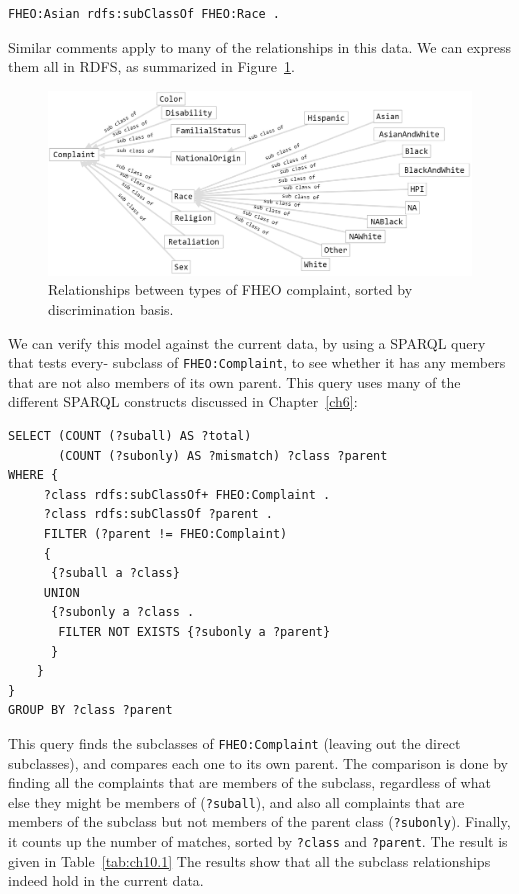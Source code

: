 \begin{lstlisting}
FHEO:Asian rdfs:subClassOf FHEO:Race .
\end{lstlisting}

Similar comments apply to many of the relationships in this data. We can
express them all in RDFS, as summarized in Figure~\ref{fig:ch10.1}.

\begin{figure}
\centering
\includegraphics[width=5in]{SWWOv3/media/ch10/figure10-4.png}
\caption{Relationships between types of FHEO complaint, sorted by discrimination basis.}
\label{fig:ch10.1}
\end{figure}



We can verify this model against the current data, by using a SPARQL
query that tests every- subclass of \texttt{FHEO:Complaint}, to see whether it
has any members that are not also members of its own parent. This query
uses many of the different SPARQL constructs discussed in Chapter~\ref{ch6}:

\begin{lstlisting}
SELECT (COUNT (?suball) AS ?total) 
       (COUNT (?subonly) AS ?mismatch) ?class ?parent
WHERE {
     ?class rdfs:subClassOf+ FHEO:Complaint .
     ?class rdfs:subClassOf ?parent .
     FILTER (?parent != FHEO:Complaint)
     {
      {?suball a ?class}
     UNION
      {?subonly a ?class .
       FILTER NOT EXISTS {?subonly a ?parent}
      }
    }
}
GROUP BY ?class ?parent
\end{lstlisting}

This query finds the subclasses of \texttt{FHEO:Complaint} (leaving out the
direct subclasses), and compares each one to its own parent. The
comparison is done by finding all the complaints that are members of the
subclass, regardless of what else they might be members of (\texttt{?suball}),
and also all complaints that are members of the subclass but not members
of the parent class (\texttt{?subonly}). Finally, it counts up the number of
matches, sorted by \texttt{?class} and \texttt{?parent}. The result is given in Table~\ref{tab:ch10.1}
The results show that all the subclass relationships indeed hold in the
current data.

